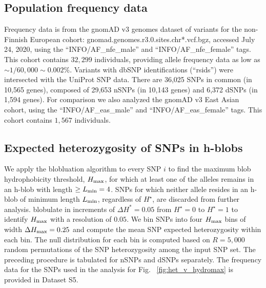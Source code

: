 \documentclass[9pt,twocolumn,twoside,lineno]{pnas-new}
\newcommand{\cmax}{H_{\rm max}}
\newcommand{\Ht}{H^{\star}}
\newcommand{\Lmin}{L_{\rm min}}
\begin{document}
\subsection*{Population frequency data}
Frequency data is from the gnomAD v3 genomes dataset of variants for the non-Finnish European cohort: gnomad.genomes.r3.0.sites.chr*.vcf.bgz, accessed July 24, 2020, using the ``INFO/AF\_nfe\_male'' and ``INFO/AF\_nfe\_female'' tags. This cohort contains $32,299$ individuals, providing allele frequency data as low as $\sim 1/60,000 \sim 0.002 \%$. Variants with dbSNP identifications (``rsids'') were intersected with the UniProt SNP data. There are 36,025 SNPs in common (in 10,565 genes), composed of 29,653 nSNPs (in 10,143 genes) and 6,372 dSNPs (in 1,594 genes). For comparison we also analyzed the gnomAD v3 East Asian cohort, using the ``INFO/AF\_eas\_male'' and ``INFO/AF\_eas\_female'' tags. This cohort contains $1,567$ individuals. 

\subsection*{Expected heterozygosity of SNPs in h-blobs}
We apply the blobluation algorithm to every SNP $i$ to find the maximum blob hydrophobicity threshold, $\cmax$, for which at least one of the alleles remains in an h-blob with length $\geq \Lmin=4$. SNPs for which neither allele resides in an h-blob of minimum length $\Lmin$, regardless of $\Ht$, are discarded from further analysis. blobulate in increments of $\Delta H^* = 0.05$ from $\Ht=0$ to $\Ht=1$ to identify $\cmax$ with a resolution of $0.05$. We bin SNPs into four $\cmax$ bins of width $\Delta \cmax = 0.25$ and compute the mean SNP expected heterozygosity within each bin. The null distribution for each bin is computed based on $R=5,000$ random permutations of the SNP heterozygosity among the input SNP set. The preceding procedure is tabulated for nSNPs and dSNPs separately. The frequency data for the SNPs used in the analysis for Fig. ~\ref{fig:het_v_hydromax} is provided in Dataset S5.
\end{document}
